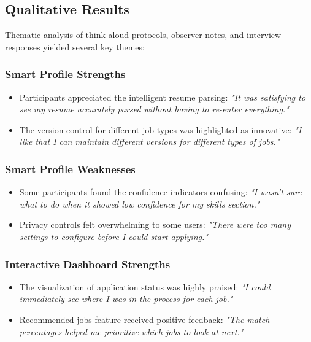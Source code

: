 \documentclass[
	letterpaper, %
]{jdf}
\begin{document}
\begin{sloppypar}
\subsection{Qualitative Results}

Thematic analysis of think-aloud protocols, observer notes, and interview responses yielded several key themes:

\subsubsection{Smart Profile Strengths}
\begin{itemize}
    \item Participants appreciated the intelligent resume parsing: \textit{"It was satisfying to see my resume accurately parsed without having to re-enter everything."}
    \item The version control for different job types was highlighted as innovative: \textit{"I like that I can maintain different versions for different types of jobs."}
\end{itemize}

\subsubsection{Smart Profile Weaknesses}
\begin{itemize}
    \item Some participants found the confidence indicators confusing: \textit{"I wasn't sure what to do when it showed low confidence for my skills section."}
    \item Privacy controls felt overwhelming to some users: \textit{"There were too many settings to configure before I could start applying."}
\end{itemize}

\subsubsection{Interactive Dashboard Strengths}
\begin{itemize}
    \item The visualization of application status was highly praised: \textit{"I could immediately see where I was in the process for each job."}
    \item Recommended jobs feature received positive feedback: \textit{"The match percentages helped me prioritize which jobs to look at next."}
\end{itemize}


\end{sloppypar}
\end{document}
